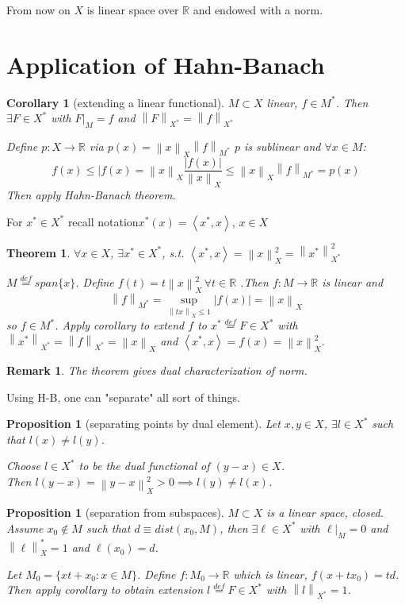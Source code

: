 \documentclass{article}
\newcommand{\nextline}{\hfill\break}
\newcommand{\inne}[2]{\left<{#1},{#2}\right>}
\newcommand{\norm}[1]{\left\|{#1}\right\|}
\newcommand{\dual}[1]{{#1}^*}
\newcommand{\func}[3]{${#1}:{#2}\xrightarrow{}{#3}$}
\newcommand{\real}{\mathbb{R}}
\newtheorem{proposition}[example]{Proposition}
\newtheorem{remark}[example]{Remark}
\newtheorem{theorem}[example]{Theorem}
\newtheorem{corollary}[example]{Corollary}
\begin{document}
From now on $X$ is linear space over $\real$ and endowed with a norm.
\newpage
\section{Application of Hahn-Banach} 
\begin{corollary}[extending a linear functional]\rm\nextline
    $M\subset X$ linear, $f\in \dual M$. Then $\exists F\in \dual X$ with $F|_M=f$ and $\norm{F}_{\dual{X}}=\norm{f}_{\dual{X}}$
    \begin{pf}{}{}
    Define \func{p}{X}{\real} via $p(x)=\norm{x}_X\norm{f}_{\dual M}$
    $p$ is sublinear and $\forall x\in M$:
    $$
f(x)\leq|f(x)=\norm{x}_X\frac{|f(x)|}{\norm{x}_X}\leq\norm{x}_X\norm{f}_{\dual M}=p(x)
    $$
    Then apply Hahn-Banach theorem. 
    \end{pf}
\end{corollary}
{{For $\dual x\in \dual X$ recall notation$ \dual x(x)=\inne{\dual x}{x}$, $x\in X$}}
\begin{theorem}\rm\nextline
    $\forall x \in  X$, $\exists \dual x \in \dual X$, s.t. $\inne{\dual x}{x}=\norm{x}_X^2=\norm{\dual x}_{\dual X}^2$
    \begin{pf}{}{}
    $M\stackrel{def}{=}{span\{x\}}$. Define
  $f(t)=t\norm{x}^2_X\,\forall t\in \real$
    .Then \func{f}{M}{\real} is linear and 
    $$
    \norm{f}_{\dual M}=\sup_{\norm{tx}_X\leq 1}|f(x)|=\norm{x}_X
    $$
    so $f\in \dual M$. Apply corollary to extend $f$ to $\dual x\stackrel{def}{=}F\in \dual X$ with $\norm{\dual x}_{\dual X}=\norm{f}_{\dual X}=\norm{x}_X$ and $\inne {\dual x}{x}=f(x)=\norm{x}^2_X. $\end{pf}
\end{theorem}
\begin{remark}\rm\nextline
    The theorem gives dual characterization of norm.
\end{remark}
Using H-B, one can "separate" all sort of things.
\begin{proposition}[separating points by dual element]\rm\nextline
	Let  $x,y\in X$, $\exists l\in\dual{X}$ such that $l(x)\neq l(y)$.
	\begin{pf}{}{}
		Choose $l\in \dual{X}$ to be the dual functional of $(y-x)\in X$. \\Then $l(y-x)=\norm{y-x}^2_X>0\implies l(y)\neq l(x)$.
	\end{pf}
\end{proposition}



\begin{proposition}[separation from subspaces]\rm\nextline
    $M\subset X$ is a linear space, closed. Assume $x_0\not\in M$ such that $d\equiv dist(x_0,M)$, then $\exists \ell\in\dual{X}$ with $\ell|_M=0$ and $\norm{\ell}_\dual{X}=1$ and $\ell(x_0)=d$.
    \begin{pf}{}{}
        Let $M_0=\{xt+x_0:x\in M\}$. Define \func{f}{M_0}{\real} which is linear, $f(x+tx_0)=td$. Then apply corollary to obtain extension $l\stackrel{def}{=}F\in \dual X$ with $\norm{l}_{\dual X}=1$.
    \end{pf}
    \end{proposition}
\end{document}
